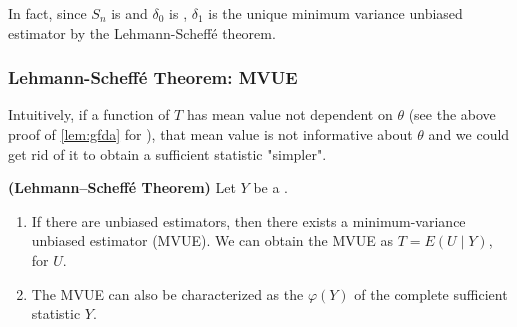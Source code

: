\documentclass{article}
\newcommand{\bfs}[1]{\textbf{({#1}) }}
\begin{document}
\begin{rema}
 In fact, since $S_{n}$ is  and $\delta_{0}$ is , $\delta_{1}$ is the unique minimum variance unbiased estimator by the Lehmann-Scheffé theorem.
\end{rema}

\subsubsection{Lehmann-Scheff\'e Theorem: MVUE}
Intuitively, if a function of $T$ has mean value not dependent on $\theta$ (see the above proof of \cref{lem:gfda} for ), that mean value is not informative about $\theta$ and we could get rid of it to obtain a sufficient statistic "simpler". 


\begin{thma}\bfs{Lehmann–Scheff\'e Theorem}
Let $Y$ be a . 
\begin{enumerate}
    \item If there are unbiased estimators, then there exists a  minimum-variance unbiased estimator (MVUE). We can obtain the MVUE as $T=E(U \mid Y)$, for  $U$.
    \item The MVUE can also be characterized as the  $\varphi(Y)$ of the complete sufficient statistic $Y$.
\end{enumerate}


\end{thma}
\end{document}
